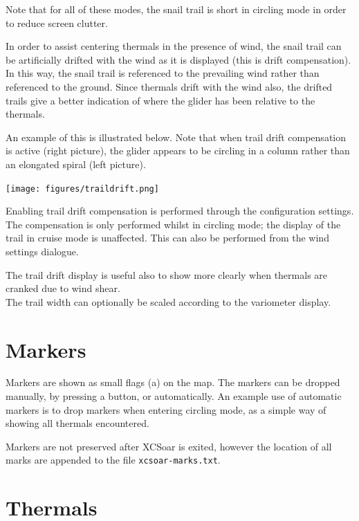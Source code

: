 Note that for all of these modes, the snail trail is short in
circling mode in order to reduce screen clutter.

In order to assist centering thermals in the presence of wind, the
snail trail can be artificially drifted with the wind as it is
displayed (this is drift compensation).  In this way, the snail trail
is referenced to the prevailing wind rather than referenced to the
ground.  Since thermals drift with the wind also, the drifted trails
give a better indication of where the glider has been relative to the
thermals.

An example of this is illustrated below.  Note that when trail drift
compensation is active (right picture), the glider appears to be
circling in a column rather than an elongated spiral (left picture).

\begin{center}
\texttt{[image: figures/traildrift.png]}
\end{center}

Enabling trail drift compensation is performed through the
configuration settings.  The compensation is only performed
whilst in circling mode; the display of the trail in cruise mode is unaffected.
This can also be performed from the wind settings dialogue.

The trail drift display is useful also to show more clearly when thermals
are cranked due to wind shear.\\
The trail width can optionally be scaled according to the variometer display.

\section{Markers}\label{sec:markers}

Markers are shown as small flags (a) on the map.  The markers can be dropped
manually, by pressing a button, or automatically.  An example use of
automatic markers is to drop markers when entering circling mode, as a
simple way of showing all thermals encountered.

Markers are not preserved after XCSoar is exited, however the location
of all marks are appended to the file \verb|xcsoar-marks.txt|.

\section{Thermals}

